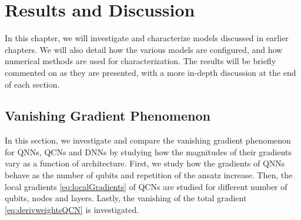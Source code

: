 \chapter{Results and Discussion}\label{chap:results_discussion}
In this chapter, we will investigate and characterize models discussed in earlier chapters. We will also detail how the various models are configured, and how numerical methods are used for characterization. The results will be briefly commented on as they are presented, with a more in-depth discussion at the end of each section.






\section{Vanishing Gradient Phenomenon}\label{sec:Vanishing Gradient Phenomenon}
In this section, we investigate and compare the vanishing gradient phenomenon for QNNs, QCNs and DNNs by studying how the magnitudes of their gradients vary as a function of architecture. First, we study how the gradients of QNNs behave as the number of qubits and repetition of the ansatz increase. Then, the local gradients \cref{eq:localGradients} of QCNs are studied for different number of qubits, nodes and layers. Lastly, the vanishing of the total gradient \cref{eq:derivweightsQCN} is investigated.


